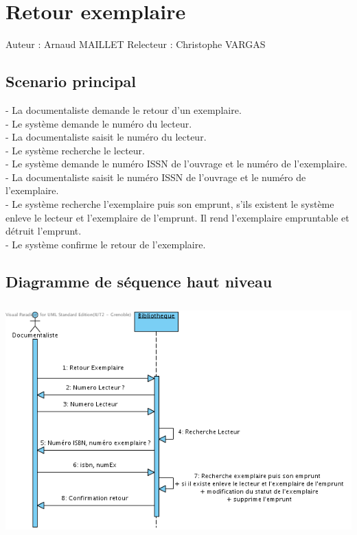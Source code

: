 \documentclass[a4paper,10pt]{report}
\begin{document}
\newpage


\chapter*{Retour exemplaire}

Auteur : Arnaud MAILLET
Relecteur : Christophe VARGAS

\bigskip
\section*{Scenario principal}
\begin{flushleft}
- La documentaliste demande le retour d'un exemplaire.\\
- Le système demande le numéro du lecteur.\\
- La documentaliste saisit le numéro du lecteur.\\
- Le système recherche le lecteur.\\
- Le système demande le numéro ISSN de l'ouvrage et le numéro de l'exemplaire.\\
- La documentaliste saisit le numéro ISSN de l'ouvrage et le numéro de l'exemplaire.\\
- Le système recherche l'exemplaire puis son emprunt, s'ils existent le système enleve le lecteur et l'exemplaire de l'emprunt. Il rend l'exemplaire empruntable et détruit l'emprunt.\\
- Le système confirme le retour de l'exemplaire.\\
\end{flushleft}

\bigskip

\section*{Diagramme de séquence haut niveau}
\bigskip
\bigskip
{}
\includegraphics[height=90mm]{RetourExemplaireHautNiveau.png}
\end{document}
